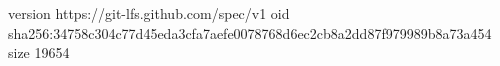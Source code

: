 version https://git-lfs.github.com/spec/v1
oid sha256:34758c304c77d45eda3cfa7aefe0078768d6ec2cb8a2dd87f979989b8a73a454
size 19654
